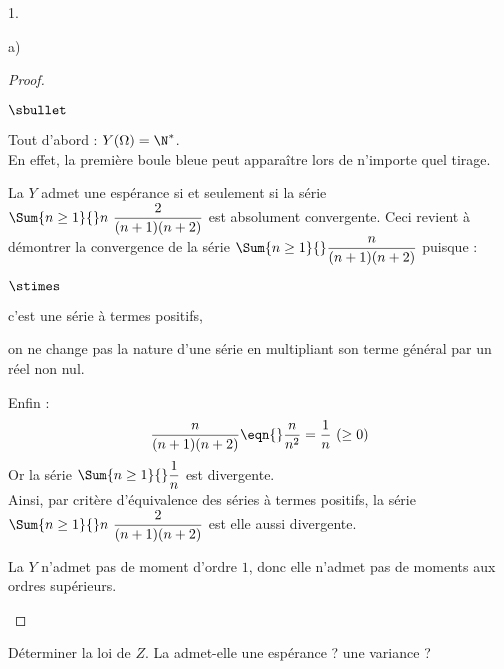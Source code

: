 \documentclass[11pt]{article}%
\begin{document}
\begin{noliste}{1.}
\begin{noliste}{a)}
    \begin{proof}~
      \begin{noliste}{$\sbullet$}
      \item Tout d'abord : $Y(\Omega) = \N^*$.\\
        En effet, la première boule bleue peut apparaître lors de
        n'importe quel tirage.
      \item La \var $Y$ admet une espérance si et seulement si la
        série $\Sum{n \geq 1}{} n \ \dfrac{2}{(n+1)(n+2)}$ est
        absolument convergente. Ceci revient à démontrer la
        convergence de la série $\Sum{n \geq 1}{}
        \dfrac{n}{(n+1)(n+2)}$ puisque :
        \begin{noliste}{$\stimes$}
        \item c'est une série à termes positifs,
        \item on ne change pas la nature d'une série en multipliant
          son terme général par un réel non nul.
        \end{noliste}

      \item Enfin :
        \[
        \dfrac{n}{(n+1)(n+2)} \eqn{} \dfrac{n}{n^2} = \dfrac{1}{n} \
        (\geq 0)
        \]
        Or la série $\Sum{n \geq 1}{} \dfrac{1}{n}$ est divergente.\\
        Ainsi, par critère d'équivalence des séries à termes positifs,
        la série $\Sum{n \geq 1}{} n \ \dfrac{2}{(n+1)(n+2)}$ est elle
        aussi divergente.  %
        
      \item La \var $Y$ n'admet pas de moment d'ordre $1$, donc elle
        n'admet pas de moments aux ordres supérieurs. %
        ~\\[-1.2cm]
      \end{noliste}
    \end{proof}
  \end{noliste}

\item Déterminer la loi de $Z$. La \var admet-elle une espérance ? une
  variance ?
 

\end{noliste}
\end{document}
